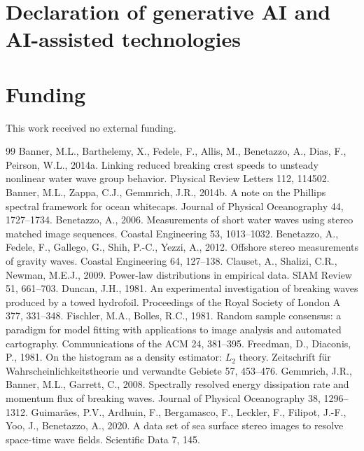 \documentclass[preprint,11pt,authoryear]{elsarticle}
\begin{document}
\section*{Declaration of generative AI and AI-assisted technologies}
\cmaideclaration

\section*{Funding}
This work received no external funding.

\begin{thebibliography}{99}
 Banner, M.L., Barthelemy, X., Fedele, F., Allis, M., Benetazzo, A., Dias, F., Peirson, W.L., 2014a. Linking reduced breaking crest speeds to unsteady nonlinear water wave group behavior. Physical Review Letters 112, 114502.
 Banner, M.L., Zappa, C.J., Gemmrich, J.R., 2014b. A note on the Phillips spectral framework for ocean whitecaps. Journal of Physical Oceanography 44, 1727--1734.
 Benetazzo, A., 2006. Measurements of short water waves using stereo matched image sequences. Coastal Engineering 53, 1013--1032.
 Benetazzo, A., Fedele, F., Gallego, G., Shih, P.-C., Yezzi, A., 2012. Offshore stereo measurements of gravity waves. Coastal Engineering 64, 127--138.
 Clauset, A., Shalizi, C.R., Newman, M.E.J., 2009. Power-law distributions in empirical data. SIAM Review 51, 661--703.
 Duncan, J.H., 1981. An experimental investigation of breaking waves produced by a towed hydrofoil. Proceedings of the Royal Society of London A 377, 331--348.
 Fischler, M.A., Bolles, R.C., 1981. Random sample consensus: a paradigm for model fitting with applications to image analysis and automated cartography. Communications of the ACM 24, 381--395.
 Freedman, D., Diaconis, P., 1981. On the histogram as a density estimator: $L_2$ theory. Zeitschrift f\"ur Wahrscheinlichkeitstheorie und verwandte Gebiete 57, 453--476.
 Gemmrich, J.R., Banner, M.L., Garrett, C., 2008. Spectrally resolved energy dissipation rate and momentum flux of breaking waves. Journal of Physical Oceanography 38, 1296--1312.
 Guimar\~aes, P.V., Ardhuin, F., Bergamasco, F., Leckler, F., Filipot, J.-F., Yoo, J., Benetazzo, A., 2020. A data set of sea surface stereo images to resolve space-time wave fields. Scientific Data 7, 145.

\end{thebibliography}
\end{document}
